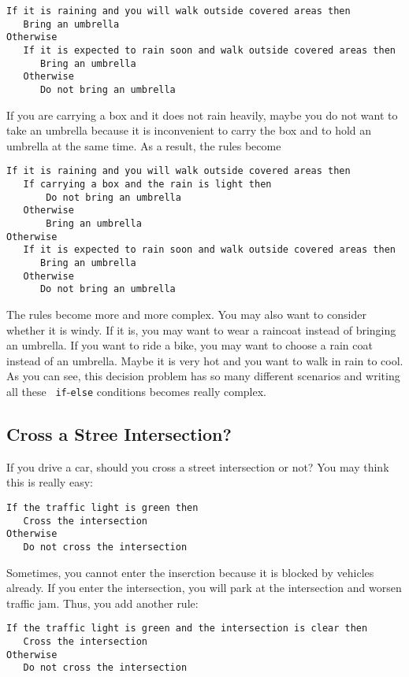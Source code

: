 \begin{verbatim}
If it is raining and you will walk outside covered areas then
   Bring an umbrella
Otherwise
   If it is expected to rain soon and walk outside covered areas then
      Bring an umbrella
   Otherwise
      Do not bring an umbrella
\end{verbatim}

If you are carrying a box and it does not rain heavily, maybe you
do not want to take an umbrella because it is inconvenient to carry
the box and to hold an umbrella at the same time. As a result,
the rules become

\begin{verbatim}
If it is raining and you will walk outside covered areas then
   If carrying a box and the rain is light then
       Do not bring an umbrella
   Otherwise
       Bring an umbrella
Otherwise
   If it is expected to rain soon and walk outside covered areas then
      Bring an umbrella
   Otherwise
      Do not bring an umbrella
\end{verbatim}

The rules become more and more complex.  You may also want to consider
whether it is windy. If it is, you may want to wear a raincoat instead
of bringing an umbrella. If you want to ride a bike, you may want to
choose a rain coat instead of an umbrella.  Maybe it is very hot and
you want to walk in rain to cool.  As you can see, this decision
problem has so many different scenarios and writing all these {\tt
  if}-{\tt else} conditions becomes really complex.

\subsection{Cross a Stree Intersection?}

If you drive a car, should you cross a street intersection or not?
You may think this is really easy:

\begin{verbatim}
If the traffic light is green then
   Cross the intersection
Otherwise
   Do not cross the intersection
\end{verbatim}

Sometimes, you cannot enter the inserction because it is blocked
by vehicles already. If you enter the intersection, you will park
at the intersection and worsen traffic jam. Thus, you add another rule:

\begin{verbatim}
If the traffic light is green and the intersection is clear then
   Cross the intersection
Otherwise
   Do not cross the intersection
\end{verbatim}


